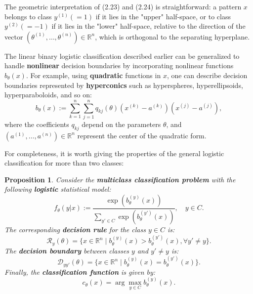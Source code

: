 \documentclass{report}
\newtheorem{proposition}{Proposition}[chapter]
\begin{document}
The geometric interpretation of (2.23) and (2.24) is straightforward: a pattern $x$ belongs to class $y^{(1)} (=1)$ if it lies in the "upper" half-space, or to class $y^{(2)}(=-1)$ if it lies in the "lower" half-space, relative to the direction of the vector $(\theta^{(1)},\dots,\theta^{(n)}) \in \mathbb{R}^n$, which is orthogonal to the separating hyperplane.

The linear binary logistic classification described earlier can be generalized to handle \textbf{nonlinear} decision boundaries by incorporating nonlinear functions $b_\theta(x)$. For example, using \textbf{quadratic} functions in $x$, one can describe decision boundaries represented by \textbf{hyperconics} such as hyperspheres, hyperellipsoids, hyperparaboloids, and so on:
\begin{equation}
 b_\theta(x) := \sum_{k=1}^{n}\sum_{j=1}^{n}q_{kj}(\theta)(x^{(k)}-a^{(k)})(x^{(j)} - a^{(j)}),
\end{equation}
where the coefficients $q_{kj}$ depend on the parameters $\theta$, and $(a^{(1)},\dots,a^{(n)}) \in \mathbb{R}^n$ represent the center of the quadratic form.

For completeness, it is worth giving the properties of the general logistic classification for more than two classes:

\begin{proposition}
Consider the \textbf{multiclass classification problem} with the following \textbf{logistic} statistical model:
\begin{equation}
f_\theta(y|x) := \frac{\exp(b_\theta^{(y)}(x))}{\sum_{y' \in C}\exp(b_\theta^{(y')}(x))}, \quad y \in C.
\end{equation}
The corresponding \textbf{decision rule} for the class $y \in C$ is:
\begin{equation}
\mathcal{R}_y(\theta) = \{x \in \mathbb{R}^n \mid b_\theta^{(y)}(x) > b_\theta^{(y')}(x), \forall y' \neq y\}.
\end{equation}
The \textbf{decision boundary} between classes $y$ and $y' \neq y$ is:
\begin{equation}
\mathcal{D}_{yy'}(\theta) = \{x \in \mathbb{R}^n \mid b_\theta^{(y)}(x) = b_\theta^{(y')}(x)\}.
\end{equation}
Finally, the \textbf{classification function} is given by:
\begin{equation}
c_\theta(x) = \arg \max_{y \in C} b_\theta^{(y)}(x).
\end{equation}
\end{proposition}
\end{document}
